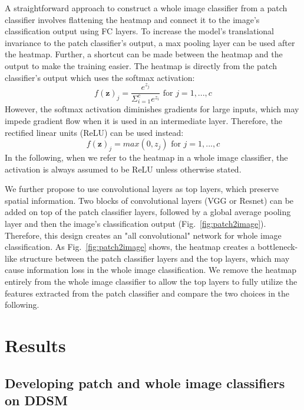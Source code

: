 \documentclass[12pt,letterpaper]{article}
\begin{document}
A straightforward approach to construct a whole image classifier from a patch classifier involves flattening the heatmap and connect it to the image's classification output using FC layers. To increase the model's translational invariance to the patch classifier's output, a max pooling layer can be used after the heatmap. Further, a shortcut can be made between the heatmap and the output to make the training easier. The heatmap is directly from the patch classifier's output which uses the softmax activation:
\begin{equation}
f(\bm{z})_{j} = \frac{e^{z_{j}}}{\Sigma_{i=1}^{c}e^{z_{i}}}\textrm{ for }j = 1, ..., c
\end{equation}
However, the softmax activation diminishes gradients for large inputs, which may impede gradient flow when it is used in an intermediate layer. Therefore, the rectified linear units (ReLU) can be used instead:
\begin{equation}
f(\bm{z})_{j} = max(0, z_{j})\textrm{ for }j = 1, ..., c
\end{equation}
In the following, when we refer to the heatmap in a whole image classifier, the activation is always assumed to be ReLU unless otherwise stated.

We further propose to use convolutional layers as top layers, which preserve spatial information. Two blocks of convolutional layers (VGG or Resnet) can be added on top of the patch classifier layers, followed by a global average pooling layer and then the image's classification output (Fig.~\ref{fig:patch2image}). Therefore, this design creates an "all convolutional" network for whole image classification. As Fig.~\ref{fig:patch2image} shows, the heatmap creates a bottleneck-like structure between the patch classifier layers and the top layers, which may cause information loss in the whole image classification. We remove the heatmap entirely from the whole image classifier to allow the top layers to fully utilize the features extracted from the patch classifier and compare the two choices in the following.

\section{Results}
\label{results}
\subsection{Developing patch and whole image classifiers on DDSM}
\end{document}
